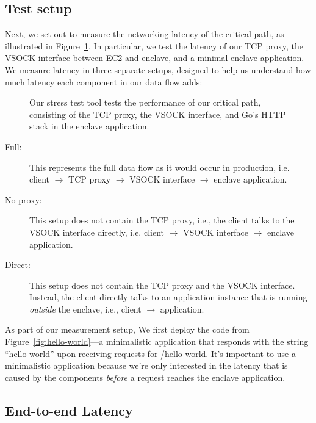 \subsection{Test setup}
\label{sec:test-setup}

Next, we set out to measure the networking latency of the critical path, as
illustrated in Figure~\ref{fig:stress-test}.  In particular, we test the
latency of our TCP proxy, the VSOCK interface between EC2 and enclave, and a
minimal enclave application.
%
We measure latency in three separate setups, designed to help us understand how
much latency each component in our data flow adds:

\begin{figure}[t]
    \centering
    
    \caption{Our stress test tool tests the performance of our critical path,
    consisting of the TCP proxy, the VSOCK interface, and Go's HTTP stack in
    the enclave application.}
    \label{fig:stress-test}
\end{figure}

\begin{description}
  \item[Full:] This represents the full data flow as it would occur in
    production, i.e. client $\rightarrow$ TCP proxy $\rightarrow$ VSOCK
    interface $\rightarrow$ enclave application.

  \item[No proxy:] This setup does not contain the TCP proxy, i.e., the client
    talks to the VSOCK interface directly, i.e. client $\rightarrow$ VSOCK
    interface $\rightarrow$ enclave application.

  \item[Direct:] This setup does not contain the TCP proxy and the VSOCK
    interface.  Instead, the client directly talks to an application instance that is
    running \emph{outside} the enclave, i.e., client $\rightarrow$ application.
\end{description}

As part of our measurement setup, We first deploy the code from
Figure~\ref{fig:hello-world}---a minimalistic application that responds with
the string ``hello world'' upon receiving requests for /hello-world.  It's
important to use a minimalistic application because we're only interested in
the latency that is caused by the components \emph{before} a request reaches
the enclave application.

\subsection{End-to-end Latency}
\label{sec:end-to-end}

